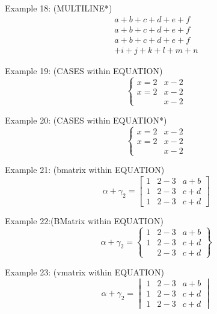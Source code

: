 \documentclass{book}
\begin{document}
\noindent Example 18: (MULTILINE*)
\begin{multline*}
	a+b+c+d+e+f \\
	a+b+c+d+e+f \\
	a+b+c+d+e+f \\
	+i+j+k+l+m+n
\end{multline*}

\noindent Example 19: (CASES within EQUATION)
\begin{equation}
	\begin{cases}
		x=2 & x-2 \\
		x=2 & x-2 \\
		    & x-2
	\end{cases}
\end{equation}

\noindent Example 20: (CASES within EQUATION*)
\begin{equation*}
	\begin{cases}
		x=2 & x-2 \\
		x=2 & x-2 \\
		    & x-2
	\end{cases}
\end{equation*}

\noindent Example 21: (bmatrix within EQUATION)
\begin{equation}
	\alpha + \gamma_{2} = \begin{bmatrix}
		1 & 2-3 & a+b \\
		1 & 2-3 & c+d \\
		1 & 2-3 & c+d
	\end{bmatrix}
\end{equation}

\noindent Example 22:(BMatrix within EQUATION)
\begin{equation*}
	\alpha + \gamma_{2} = \begin{Bmatrix}
		1 & 2-3 & a+b \\
		1 & 2-3 & c+d \\
		  & 2-3 & c+d
	\end{Bmatrix}
\end{equation*}

\noindent Example 23: (vmatrix within EQUATION)
\begin{equation*}
	\alpha + \gamma_{2} = \begin{vmatrix}
		1 & 2-3 & a+b \\
		1 & 2-3 & c+d \\
		1 & 2-3 & c+d
	\end{vmatrix}
\end{equation*}
\end{document}
